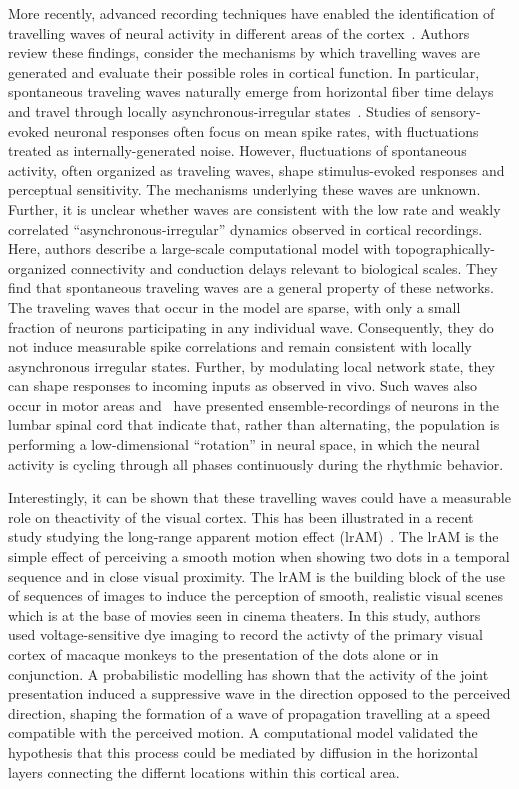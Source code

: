 \documentclass[brainsci, %
               review,submit,pdftex,moreauthors%
               ]{Definitions/mdpi}
\begin{document}
More recently, advanced recording techniques have enabled the identification of travelling waves of neural activity in different areas of the cortex~\citep{muller_cortical_2018}. Authors review these findings, consider the mechanisms by which travelling waves are generated and evaluate their possible roles in cortical function. In particular, spontaneous traveling waves naturally emerge from horizontal fiber time delays and travel through locally asynchronous-irregular states~\citep{davis_spontaneous_2021}. Studies of sensory-evoked neuronal responses often focus on mean spike rates, with fluctuations treated as internally-generated noise. However, fluctuations of spontaneous activity, often organized as traveling waves, shape stimulus-evoked responses and perceptual sensitivity. The mechanisms underlying these waves are unknown. Further, it is unclear whether waves are consistent with the low rate and weakly correlated ``asynchronous-irregular'' dynamics observed in cortical recordings. Here, authors describe a large-scale computational model with topographically-organized connectivity and conduction delays relevant to biological scales. They find that spontaneous traveling waves are a general property of these networks. The traveling waves that occur in the model are sparse, with only a small fraction of neurons participating in any individual wave. Consequently, they do not induce measurable spike correlations and remain consistent with locally asynchronous irregular states. Further, by modulating local network state, they can shape responses to incoming inputs as observed in vivo. Such waves also occur in motor areas and~\citep{linden_movement_2021} have presented ensemble-recordings of neurons in the lumbar spinal cord that indicate that, rather than alternating, the population is performing a low-dimensional ``rotation'' in neural space, in which the neural activity is cycling through all phases continuously during the rhythmic behavior.

Interestingly, it can be shown that these travelling waves could have a measurable role on theactivity of the visual cortex. This has been illustrated in a recent study studying the long-range apparent motion effect (lrAM)~\citep{chemla_suppressive_2019}. The lrAM is the simple effect of perceiving a smooth motion when showing two dots in a temporal sequence and in close visual proximity. The lrAM is the building block of the use of sequences of images to induce the perception of smooth, realistic visual scenes which is at the base of movies seen in cinema theaters. In this study, authors used voltage-sensitive dye imaging to record the activty of the primary visual cortex of macaque monkeys to the presentation of the dots alone or in conjunction. A probabilistic modelling has shown that the activity of the joint presentation induced a suppressive wave in the direction opposed to the perceived direction, shaping the formation of a wave of propagation travelling at a speed compatible with the perceived motion. A computational model validated the hypothesis that this process could be mediated by diffusion in the horizontal layers connecting the differnt locations within this cortical area.
%
\end{document}
